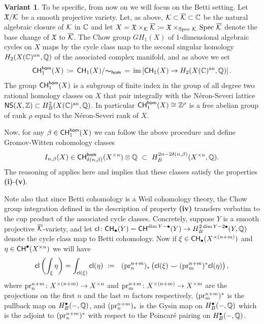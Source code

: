 \documentclass[twoside,leqno]{article}
\numberwithin{equation}{section}
\theoremstyle{plain}
\theoremstyle{definition}
\newtheorem{variant}[equation]{Variant}
\begin{document}
\begin{variant}
\medskip 


To be specific, from now on we will focus on the Betti setting. 
Let $\mathfrak{X}/\mathcal K$ be a smooth projective variety. Let, as above, $\mathcal K \subset \overline{\mathcal K} \subset \mathbb C$ be the natural algebraic closure of $\mathcal K$ in $\mathbb C$ and let $X = \mathfrak{X}\times_{\mathcal K} \overline{\mathcal K} \coloneqq \mathfrak{X}\times_{\operatorname{Spec}\, \mathcal K} \, \operatorname{Spec}\, \overline{\mathcal K}$ denote the base change of $\mathfrak{X}$ to $\overline{\mathcal K}$.
The Chow group $GH_{1}(X)$ of $1$-dimensional algebraic cycles on $X$ maps by the cycle class map to the second singular homology $H_{2}(X(\mathbb C)^{an},\mathbb Q)$ of the associated complex manifold, and as above we set 
\[
\mathsf{CH}^{\mathsf{hom}}_{1}(X)  \, \coloneqq  \, \mathsf{CH}_{1}(X)/{\boldsymbol{\sim}_{\mathsf{hom}}} \, = \, \operatorname{im}\left[ \mathsf{CH}_{1}(X) \to H_{2}(X(\mathbb C)^{\operatorname{an}},\mathbb Q)\right].
\]
The group $\mathsf{CH}^{\mathsf{hom}}_{1}(X)$ is a subgroup of finite index in the group of all degree two rational homology classes on $X$ that pair integrally with  the N\'{e}ron-Severi lattice $\mathsf{NS}(X,\mathbb Z) \subset H^{2}_{B}(X(\mathbb C)^{\operatorname{an}},\mathbb Q)$. In particular $\mathsf{CH}^{\mathsf{hom}}_{1}(X) \cong \mathbb Z^{\rho}$ is a free abelian group of rank $\rho$ equal to the N\'{e}ron-Severi rank of $X$. 

Now, for any $\beta \in \mathsf{CH}^{\mathsf{hom}}_{1}(X)$ we can follow the above procedure and define Gromov-Witten cohomology classes 
\[
I_{n,\beta}(X) \in \CHhom_{\delta(n,\beta)}(X^{\times n})\otimes \bbQ \ \subset \ 
H^{2n - 2\delta(n,\beta)}_{B}(X^{\times n},\bbQ).
\]
The reasoning of \cite{Kontsevich_Gromov-Witten_classes} applies here and implies that these classes satisfy the properties {\bfseries (i)}-{\bfseries (v)}.  

\medskip

Note also that since Betti cohomology is a Weil cohomology theory, the Chow group integration defined in the description of property {\bfseries (iv)} transfers verbatim to the cup product 
of the associated cycle classes. Concretely, suppose $Y$ is a smooth projective $\overline{\mathcal K}$-variety, and let \linebreak $\mathsf{cl} \colon \mathsf{CH}_{\bullet}(Y) = \mathsf{CH}^{\dim Y-\bullet}(Y) \to H^{2\dim Y - 2\bullet}_{B}(Y,\mathbb Q)$ denote the cycle class map to Betti cohomology. Now if 
$\xi \in \mathsf{CH}_{\bullet}(X^{\times (n+m)})$ and $\eta \in \mathsf{CH}^{\bullet}(X^{\times n})$ we will have 
\[
\mathsf{cl}\left(\int_{\xi} \eta\right) = \int_{\mathsf{cl}(\xi)} \mathsf{cl}(\eta) \ \coloneqq \
\  (\operatorname{pr}^{n+m}_{n})_{*}\left(\mathsf{cl}(\xi) \smile 
(\operatorname{pr}^{n+m}_{m})^{*}\mathsf{cl}(\eta)\right),
\]
where  $\operatorname{pr}^{n+m}_{n} \colon X^{\times (n+m)} \to X^{\times n}$ and 
$\operatorname{pr}^{n+m}_{m} \colon X^{\times (n+m)} \to X^{\times m}$ are the projections on the first $n$ and the last $m$ factors respectively, $(\operatorname{pr}^{n+m}_{m})^{*}$ is the pullback map on $H^{\bullet}_{B}(-,\mathbb Q)$, and $(\operatorname{pr}^{n+m}_{n})_{*}$ is the Gysin map on $H^{\bullet}_{B}(-,\mathbb Q)$ which is the adjoint  to 
$(\operatorname{pr}^{n+m}_{n})^{*}$ with respect to the Poincar\'{e} pairing on 
$H^{\bullet}_{B}(-,\mathbb Q)$.
\end{variant}
\end{document}
